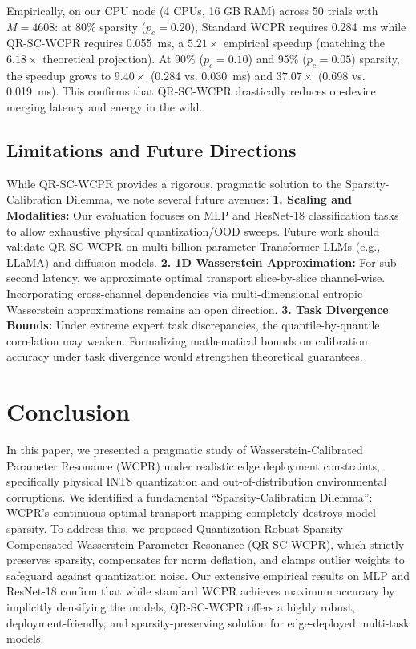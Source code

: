\documentclass{article}
\theoremstyle{plain}
\theoremstyle{definition}
\theoremstyle{remark}
\begin{document}
Empirically, on our CPU node (4 CPUs, 16 GB RAM) across 50 trials with $M = 4608$: at 80\% sparsity ($p_c = 0.20$), Standard WCPR requires 0.284~ms while QR-SC-WCPR requires 0.055~ms, a \textbf{$5.21\times$} empirical speedup (matching the $6.18\times$ theoretical projection). At 90\% ($p_c = 0.10$) and 95\% ($p_c = 0.05$) sparsity, the speedup grows to \textbf{$9.40\times$} (0.284 vs. 0.030~ms) and \textbf{$37.07\times$} (0.698 vs. 0.019~ms). This confirms that QR-SC-WCPR drastically reduces on-device merging latency and energy in the wild.

\subsection{Limitations and Future Directions}
While QR-SC-WCPR provides a rigorous, pragmatic solution to the Sparsity-Calibration Dilemma, we note several future avenues:
\textbf{1. Scaling and Modalities:} Our evaluation focuses on MLP and ResNet-18 classification tasks to allow exhaustive physical quantization/OOD sweeps. Future work should validate QR-SC-WCPR on multi-billion parameter Transformer LLMs (e.g., LLaMA) and diffusion models.
\textbf{2. 1D Wasserstein Approximation:} For sub-second latency, we approximate optimal transport slice-by-slice channel-wise. Incorporating cross-channel dependencies via multi-dimensional entropic Wasserstein approximations remains an open direction.
\textbf{3. Task Divergence Bounds:} Under extreme expert task discrepancies, the quantile-by-quantile correlation may weaken. Formalizing mathematical bounds on calibration accuracy under task divergence would strengthen theoretical guarantees.

\section{Conclusion}
\label{sec:conclusion}

In this paper, we presented a pragmatic study of Wasserstein-Calibrated Parameter Resonance (WCPR) under realistic edge deployment constraints, specifically physical INT8 quantization and out-of-distribution environmental corruptions. We identified a fundamental ``Sparsity-Calibration Dilemma'': WCPR's continuous optimal transport mapping completely destroys model sparsity. To address this, we proposed Quantization-Robust Sparsity-Compensated Wasserstein Parameter Resonance (QR-SC-WCPR), which strictly preserves sparsity, compensates for norm deflation, and clamps outlier weights to safeguard against quantization noise. Our extensive empirical results on MLP and ResNet-18 confirm that while standard WCPR achieves maximum accuracy by implicitly densifying the models, QR-SC-WCPR offers a highly robust, deployment-friendly, and sparsity-preserving solution for edge-deployed multi-task models.
\end{document}
